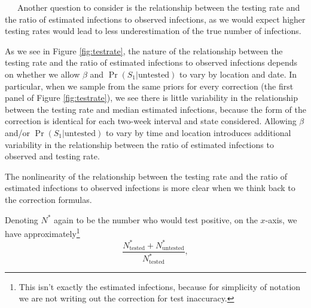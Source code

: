 \documentclass[12pt,twoside]{smiththesis}
\begin{document}
~~~Another question to consider is the relationship between the testing rate and the ratio of estimated infections to observed infections, as we would expect higher testing rates would lead to less underestimation of the true number of infections.

As we see in Figure \ref{fig:testrate}, the nature of the relationship between the testing rate and the ratio of estimated infections to observed infections depends on whether we allow \(\beta\) and \(\Pr(S_1|\text{untested})\) to vary by location and date. In particular, when we sample from the same priors for every correction (the first panel of Figure \ref{fig:testrate}), we see there is little variability in the relationship between the testing rate and median estimated infections, because the form of the correction is identical for each two-week interval and state considered. Allowing \(\beta\) and/or \(\Pr(S_1|\text{untested})\) to vary by time and location introduces additional variability in the relationship between the ratio of estimated infections to observed and testing rate.

The nonlinearity of the relationship between the testing rate and the ratio of estimated infections to observed infections is more clear when we think back to the correction formulas.

Denoting \(N^*\) again to be the number who would test positive, on the \(x\)-axis, we have approximately\footnote{This isn't exactly the estimated infections, because for simplicity of notation we are not writing out the correction for test inaccuracy.}
\[\frac{N^*_{\text{tested}} + N^*_{\text{untested}}}{N^*_{\text{tested}}},\]
\end{document}
